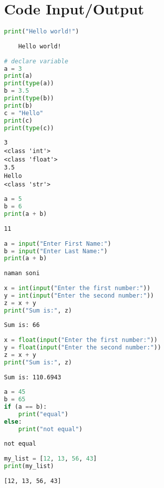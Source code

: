 \documentclass{article}
\begin{document}
\section{\textbf{Code Input/Output}}
\begin{lstlisting}[language=python,caption=print function input]
    print("Hello world!")
\end{lstlisting}
\begin{lstlisting}
    Hello world!
\end{lstlisting}
\begin{lstlisting}[language=python,caption=declaring variable input]
# declare variable
a = 3
print(a)
print(type(a))
b = 3.5
print(type(b))
print(b)
c = "Hello"
print(c)
print(type(c))
\end{lstlisting}
\begin{lstlisting}
3
<class 'int'>
<class 'float'>
3.5
Hello
<class 'str'>
\end{lstlisting}
\begin{lstlisting}[language=python,caption=performing arithmetic operation input]
a = 5
b = 6
print(a + b)
\end{lstlisting}
\begin{lstlisting}
11
\end{lstlisting}
\begin{lstlisting}[language=python]
a = input("Enter First Name:")
b = input("Enter Last Name:")
print(a + b)
\end{lstlisting}
\begin{lstlisting}
naman soni 
\end{lstlisting}
\begin{lstlisting}[language=python]
x = int(input("Enter the first number:"))
y = int(input("Enter the second number:"))
z = x + y
print("Sum is:", z)
\end{lstlisting}
\begin{lstlisting}
Sum is: 66
\end{lstlisting}
\begin{lstlisting}[language=python]
x = float(input("Enter the first number:"))
y = float(input("Enter the second number:"))
z = x + y
print("Sum is:", z)
\end{lstlisting}
\begin{lstlisting}
Sum is: 110.6943    
\end{lstlisting}
\begin{lstlisting}[language=python]
a = 45
b = 65
if (a == b):
    print("equal")
else:
    print("not equal")
\end{lstlisting}
\begin{lstlisting}
not equal
\end{lstlisting}
\begin{lstlisting}[language=python]
my_list = [12, 13, 56, 43]
print(my_list)
\end{lstlisting}
\begin{lstlisting}
[12, 13, 56, 43]
\end{lstlisting}
\end{document}
